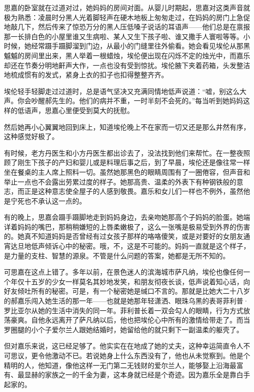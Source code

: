 \par 思嘉的卧室就在过道对过，她妈妈的房间对面。从婴儿时期起，思嘉对这类声音就极为熟悉：凌晨时分黑人光着脚轻声在硬木地板上匆匆走过，在妈妈的房门上急促地敲几下，然后传来了惊恐万分的黑人压低嗓子说话的耳语声——他们总是在禀报那一长排白色的小屋里谁又生病啦、某人又生下孩子啦、谁又撒手人寰啦等等。小时候，她经常蹑手蹑脚溜到门边，从最小的门缝里往外偷看。她会看见埃伦从那黑魆魆的房间里出来，黑人举着一根蜡烛，埃伦便出现在闪烁不定的烛光中，而嘉乐却还在节奏分明地鼾声大作，一点也没有受到惊扰。埃伦腋下夹着药箱，头发整洁地梳成惯有的发式，紧身上衣的扣子也扣得整整齐齐。
\par 埃伦轻手轻脚走过过道时，总是语气坚决又充满同情地低声说道：“嘘，别这么大声。你会吵醒郝先生的。他们的病并不重，一时半刻不会死的。”每当听到她妈妈这样的低语声，思嘉心里便受到莫大的抚慰。
\par 然后她再小心翼翼地回到床上，知道埃伦晚上不在家而一切又还是那么井然有序，这种感觉好极了。
\par 有时候，老方丹医生和小方丹医生都出诊去了，没法找到他们来帮忙。在一整夜照顾了刚生下孩子的产妇和婴儿或是料理后事之后，到了早晨，埃伦还是像往常一样坐在餐桌的主人席上照料一切。虽然她那黑色的眼睛周围有了一圈倦容，但声音和举止一点也不会露出劳累过度的样子。她那高贵、温柔的外表下有种钢铁般的意志，而正是这种意志使全屋子的人感到敬畏。嘉乐和女儿们一样也不例外，虽然他是宁死也不承认这一点的。
\par 有的晚上，思嘉会蹑手蹑脚地走到妈妈身边，去亲吻她那高个子妈妈的脸蛋。她端详着妈妈的嘴巴，那稍稍嫌短的上唇柔嫩极了，这么一张嘴是极易受到外界的伤害的。她真不知道妈妈是否曾经有过女孩子那样的咯咯傻笑，或是对要好的女朋友通宵达旦地低声倾诉心中的秘密。哦，不，这是不可能的。妈妈一直就是这个样子，是力量的支柱、智慧的源泉。不管是什么问题的答案，她都是无所不知的。
\par 可思嘉在这点上错了。多年以前，在景色迷人的滨海城市萨凡纳，埃伦也像任何一个年仅十五岁的少女一样莫名其妙地发笑，和朋友彻夜长谈，低声说着知心话，向好友倾吐所有的秘密。可是，有一个秘密她是缄口不言的。那就是比她大二十八岁的郝嘉乐闯入她生活的那一年——也就是她那年轻潇洒、眼珠乌黑的表哥菲利普·罗比亚尔从她的生活中消失的同一年。菲利普长着一双会勾人的眼睛，行为方式放荡豪爽。自他永远离开了萨凡纳以后，他也把埃伦心中所有的激情给带走了。而当罗圈腿的小个子爱尔兰人跟她结婚时，她留给他的就只剩下一副温柔的躯壳了。
\par 但对嘉乐来说，这已经足够了。他实实在在地成了她的丈夫，这种幸运简直令人不可思议，更令他激动不已。若说她身上什么东西没有了，他也从未觉察到。他是个精明的人，他知道，像他这样一无门第二无钱财的爱尔兰人，能够娶上沿海最富有、最显赫的家族之一的千金为妻，这本身就已经是个奇迹。因为嘉乐全是靠白手起家的。
